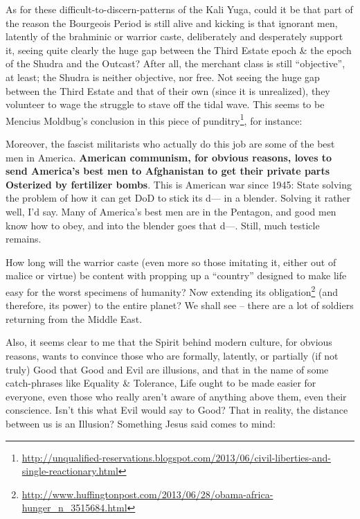 As for these difficult-to-discern-patterns of the Kali Yuga, could it be that part of the reason the Bourgeois Period is still alive and kicking is that ignorant men, latently of the brahminic or warrior caste, deliberately and desperately support it, seeing quite clearly the huge gap between the Third Estate epoch \& the epoch of the Shudra and the Outcast? After all, the merchant class is still ``objective'', at least; the Shudra is neither objective, nor free. Not seeing the huge gap between the Third Estate and that of their own (since it is unrealized), they volunteer to wage the struggle to stave off the tidal wave. This seems to be Mencius Moldbug's conclusion in this piece of punditry\footnote{\url{http://unqualified-reservations.blogspot.com/2013/06/civil-liberties-and-single-reactionary.html}}, for instance:

\begin{quotex}
Moreover, the fascist militarists who actually do this job are some of the best men in America. \textbf{American communism, for obvious reasons, loves to send America's best men to Afghanistan to get their private parts Osterized by fertilizer bombs}. This is American war since 1945: State solving the problem of how it can get DoD to stick its d--- in a blender. Solving it rather well, I'd say. Many of America's best men are in the Pentagon, and good men know how to obey, and into the blender goes that d---. Still, much testicle remains.
\end{quotex}


How long will the warrior caste (even more so those imitating it, either out of malice or virtue) be content with propping up a ``country'' designed to make life easy for the worst specimens of humanity? Now extending its obligation\footnote{\url{http://www.huffingtonpost.com/2013/06/28/obama-africa-hunger\_n\_3515684.html}} (and therefore, its power) to the entire planet? We shall see -- there are a lot of soldiers returning from the Middle East.

Also, it seems clear to me that the Spirit behind modern culture, for obvious reasons, wants to convince those who are formally, latently, or partially (if not truly) Good that Good and Evil are illusions, and that in the name of some catch-phrases like Equality \& Tolerance, Life ought to be made easier for everyone, even those who really aren't aware of anything above them, even their conscience. Isn't this what Evil would say to Good? That in reality, the distance between us is an Illusion? Something Jesus said comes to mind:

